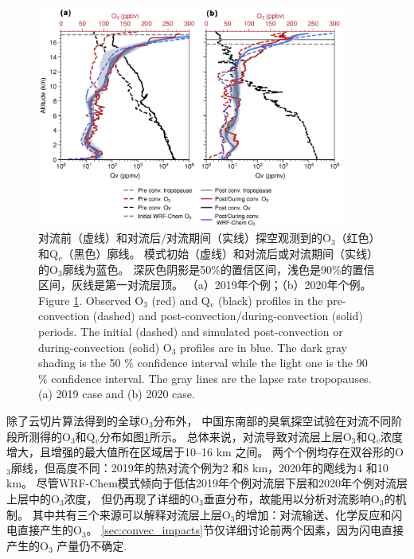 \begin{figure}[H]
\centering
\includegraphics[width=0.9\textwidth]{./figures/ozonesonde_profile.png}
\caption{对流前（虚线）和对流后/对流期间（实线）探空观测到的O$_3$（红色）和Q$_v$（黑色）廓线。
模式初始（虚线）和对流后或对流期间（实线）的O$_3$廓线为蓝色。
深灰色阴影是50\%的置信区间，浅色是90\%的置信区间，灰线是第一对流层顶。
（a）2019年个例；（b）2020年个例。\\
Figure \ref{fig:ozonesonde_profile}. Observed O$_3$ (red) and Q$_v$ (black) profiles in the pre-convection (dashed) and post-convection/during-convection (solid) periods.
The initial (dashed) and simulated post-convection or during-convection (solid) O$_3$ profiles are in blue.
The dark gray shading is the 50 \% confidence interval while the light one is the 90 \% confidence interval.
The gray lines are the lapse rate tropopauses.
(a) 2019 case and (b) 2020 case.
}
\label{fig:ozonesonde_profile}
\end{figure}

除了云切片算法得到的全球O$_3$分布外，
中国东南部的臭氧探空试验在对流不同阶段所测得的O$_3$和Q$_v$分布如图\ref{fig:ozonesonde_profile}所示。
总体来说，对流导致对流层上层O$_3$和Q$_v$浓度增大，且增强的最大值所在区域居于10--16 km 之间。
两个个例均存在双谷形的O$_3$廓线，但高度不同：2019年的热对流个例为2 和8 km，2020年的飑线为4 和10 km。
尽管WRF-Chem模式倾向于低估2019年个例对流层下层和2020年个例对流层上层中的O$_3$浓度，
但仍再现了详细的O$_3$垂直分布，故能用以分析对流影响O$_3$的机制。
其中共有三个来源可以解释对流层上层O$_3$的增加：对流输送、化学反应和闪电直接产生的O$_3$。
\ref{sec:convec_impacts}节仅详细讨论前两个因素，因为闪电直接产生的O$_3$
产量仍不确定\citep{Morris.2010,Ripoll.2014}.




